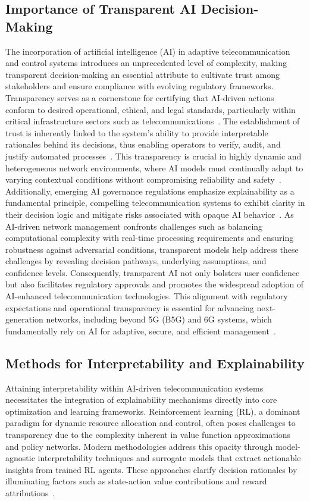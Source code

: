\documentclass[sigconf]{acmart}
\begin{document}
\subsection{Importance of Transparent AI Decision-Making}

The incorporation of artificial intelligence (AI) in adaptive telecommunication and control systems introduces an unprecedented level of complexity, making transparent decision-making an essential attribute to cultivate trust among stakeholders and ensure compliance with evolving regulatory frameworks. Transparency serves as a cornerstone for certifying that AI-driven actions conform to desired operational, ethical, and legal standards, particularly within critical infrastructure sectors such as telecommunications~\cite{ref7,ref13}. The establishment of trust is inherently linked to the system’s ability to provide interpretable rationales behind its decisions, thus enabling operators to verify, audit, and justify automated processes~\cite{ref15}. This transparency is crucial in highly dynamic and heterogeneous network environments, where AI models must continually adapt to varying contextual conditions without compromising reliability and safety~\cite{ref48}. Additionally, emerging AI governance regulations emphasize explainability as a fundamental principle, compelling telecommunication systems to exhibit clarity in their decision logic and mitigate risks associated with opaque AI behavior~\cite{ref50}. As AI-driven network management confronts challenges such as balancing computational complexity with real-time processing requirements and ensuring robustness against adversarial conditions, transparent models help address these challenges by revealing decision pathways, underlying assumptions, and confidence levels. Consequently, transparent AI not only bolsters user confidence but also facilitates regulatory approvals and promotes the widespread adoption of AI-enhanced telecommunication technologies. This alignment with regulatory expectations and operational transparency is essential for advancing next-generation networks, including beyond 5G (B5G) and 6G systems, which fundamentally rely on AI for adaptive, secure, and efficient management~\cite{ref7,ref13,ref50}.

\subsection{Methods for Interpretability and Explainability}

Attaining interpretability within AI-driven telecommunication systems necessitates the integration of explainability mechanisms directly into core optimization and learning frameworks. Reinforcement learning (RL), a dominant paradigm for dynamic resource allocation and control, often poses challenges to transparency due to the complexity inherent in value function approximations and policy networks. Modern methodologies address this opacity through model-agnostic interpretability techniques and surrogate models that extract actionable insights from trained RL agents. These approaches clarify decision rationales by illuminating factors such as state-action value contributions and reward attributions~\cite{ref3,ref5}.
\end{document}
